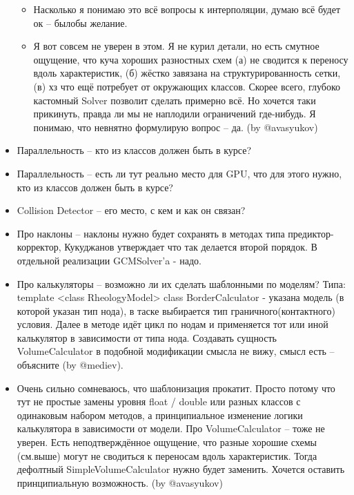 \documentclass[a4paper,12pt]{article}
\numberwithin{equation}{section}
\begin{document}
\begin{itemize}
		\begin{itemize}
			\item{Насколько я понимаю это всё вопросы к интерполяции, думаю всё будет ок -- былобы желание.}
			\item{Я вот совсем не уверен в этом. Я не курил детали, но есть смутное ощущение, что куча хороших разностных схем (а) не сводится к переносу вдоль характеристик, (б) жёстко завязана на структурированность сетки, (в) хз что ещё потребует от окружающих классов. Скорее всего, глубоко кастомный Solver позволит сделать примерно всё. Но хочется таки прикинуть, правда ли мы не наплодили ограничений где-нибудь. Я понимаю, что невнятно формулирую вопрос -- да. (by @avasyukov)}
		\end{itemize}
		\item{Параллельность -- кто из классов должен быть в курсе?}
		\item{Параллельность -- есть ли тут реально место для GPU, что для этого нужно, кто из классов должен быть в курсе?}
		\item{Collision Detector -- его место, с кем и как он связан?}
		\item{Про наклоны -- наклоны нужно будет сохранять в методах типа предиктор-корректор, Кукуджанов утверждает что так делается второй порядок. В отдельной реализации GCMSolver'a - надо.}
		\item{Про калькуляторы -- возможно ли их сделать шаблонными по моделям? Типа: template <class RheologyModel> class BorderCalculator - указана модель (в которой указан тип нода), в таске выбирается тип граничного(контактного) условия. Далее в методе идёт цикл по нодам и применяется тот или иной калькулятор в зависимости от типа нода. Создавать сущность VolumeCalculator в подобной модификации смысла не вижу, смысл есть -- объясните (by @mediev).}
		\item{Очень сильно сомневаюсь, что шаблонизация прокатит. Просто потому что тут не простые замены уровня float / double или разных классов с одинаковым набором методов, а принципиальное изменение логики калькулятора в зависимости от модели. Про VolumeCalculator -- тоже не уверен. Есть неподтверждённое ощущение, что разные хорошие схемы (см.выше) могут не сводиться к переносам вдоль характеристик. Тогда дефолтный SimpleVolumeCalculator нужно будет заменить. Хочется оставить принципиальную возможность. (by @avasyukov)}
	\end{itemize}

\listoftodos
\end{document}
